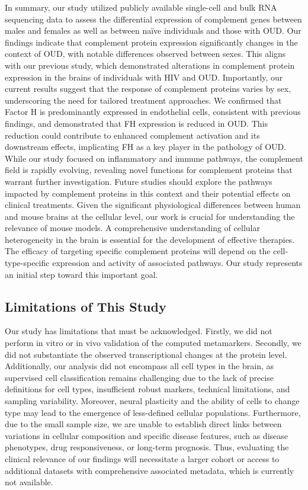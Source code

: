 \documentclass[10pt,letterpaper]{article}
\begin{document}
In summary, our study utilized publicly available single-cell and bulk RNA sequencing data to assess the differential expression of complement genes between males and females as well as between naïve individuals and those with OUD. Our findings indicate that complement protein expression significantly changes in the context of OUD, with notable differences observed between sexes. This aligns with our previous study, which demonstrated alterations in complement protein expression in the brains of individuals with HIV and OUD. Importantly, our current results suggest that the response of complement proteins varies by sex, underscoring the need for tailored treatment approaches.
We confirmed that Factor H is predominantly expressed in endothelial cells, consistent with previous findings, and demonstrated that FH expression is reduced in OUD. This reduction could contribute to enhanced complement activation and its downstream effects, implicating FH as a key player in the pathology of OUD.
While our study focused on inflammatory and immune pathways, the complement field is rapidly evolving, revealing novel functions for complement proteins that warrant further investigation. Future studies should explore the pathways impacted by complement proteins in this context and their potential effects on clinical treatments. Given the significant physiological differences between human and mouse brains at the cellular level, our work is crucial for understanding the relevance of mouse models.
A comprehensive understanding of cellular heterogeneity in the brain is essential for the development of effective therapies. The efficacy of targeting specific complement proteins will depend on the cell-type-specific expression and activity of associated pathways. Our study represents an initial step toward this important goal.


\subsection*{Limitations of This Study}
Our study has limitations that must be acknowledged. Firstly, we did not perform in vitro or in vivo validation of the computed metamarkers. Secondly, we did not substantiate the observed transcriptional changes at the protein level. Additionally, our analysis did not encompass all cell types in the brain, as supervised cell classification remains challenging due to the lack of precise definitions for cell types, insufficient robust markers, technical limitations, and sampling variability. Moreover, neural plasticity and the ability of cells to change type may lead to the emergence of less-defined cellular populations.
Furthermore, due to the small sample size, we are unable to establish direct links between variations in cellular composition and specific disease features, such as disease phenotypes, drug responsiveness, or long-term prognosis. Thus, evaluating the clinical relevance of our findings will necessitate a larger cohort or access to additional datasets with comprehensive associated metadata, which is currently not available.
\end{document}
